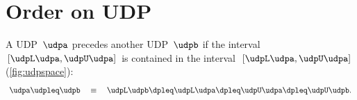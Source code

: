 \section{Order on UDP}
\begin{definition}
    A UDP~$\udpa$ precedes another UDP~$\udpb$ if the interval~$[\udpL\udpa,\udpU\udpa]$
    is contained in the interval~$[\udpL\udpa,\udpU\udpa]$ (\cref{fig:udpspace}):
    \[
        \udpa\udpleq\udpb\quad\equiv\quad\udpL\udpb\dpleq\udpL\udpa\dpleq\udpU\udpa\dpleq\udpU\udpb.
    \]
\end{definition}

